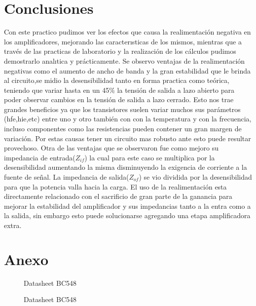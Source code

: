 \documentclass[12pt, letterpaper]{article}
\begin{document}
\section{Conclusiones}
Con este practico pudimos ver los efectos que causa la realimentación negativa en los amplificadores, mejorando las caracterısticas de los mismos, mientras que a través de las practicas de laboratorio y la realización de los cálculos pudimos demostrarlo analıtica y prácticamente.
\singlespacing
Se observo  ventajas de la realimentación negativas como el aumento de ancho de banda y la gran estabilidad que le brinda al circuito,se midio la desensibilidad tanto en forma practica como teórica, teniendo que variar hasta en un 45\% la tensión de salida a lazo abierto para poder observar cambios en la tensión de salida a lazo cerrado. Esto nos trae grandes beneficios ya que los transistores suelen variar muchos sus parámetros (hfe,hie,etc) entre uno y otro también con con la temperatura y con la frecuencia, incluso componentes como las resistencias pueden contener un gran margen de variación.  Por estas causas tener un circuito mas robusto ante esto puede resultar provechoso. 
\singlespacing
Otra de las ventajas que se observaron fue como mejoro su impedancia de entrada($Z_{if}$) la cual para este caso se multiplica por la desensibilidad aumentando la misma disminuyendo la exigencia de  corriente a la fuente de señal. La impedancia de salida($Z_{of}$) se vio dividida por la desensibilidad para que la potencia valla hacia la carga.
\singlespacing
El uso de la realimentación esta directamente relacionado con el sacrificio de gran parte de la ganancia para mejorar la estabilidad del amplificador y sus impedancias tanto a la entra como a la salida, sin embargo esto puede solucionarse agregando una etapa amplificadora extra. 


\newpage
\section{Anexo}
\begin{figure}[H]
    \centering
    
    \caption{Datasheet BC548}
    \label{fig:datasheet_bc548}
\end{figure}
\newpage
\begin{figure}[H]
    \centering
    
    \caption{Datasheet BC548}
\end{figure}


\label{LastPage}
\end{document}
